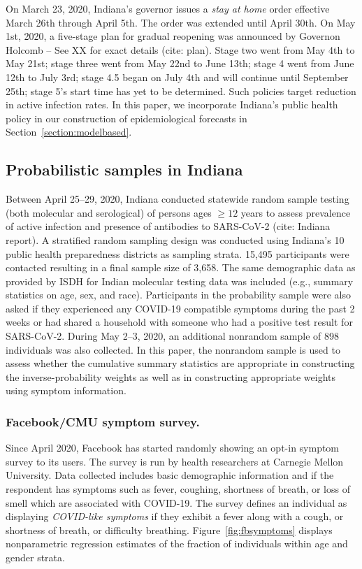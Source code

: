 \documentclass[12pt]{amsart}
\numberwithin{equation}{section}
\theoremstyle{plain}
\begin{document}
On March 23, 2020, Indiana's governor issues a \emph{stay at home} order effective March 26th through April 5th.  The order was extended until April 30th. On May 1st, 2020, a five-stage plan for gradual reopening was announced by Governon Holcomb -- See XX for exact details (cite: plan).  Stage two went from May 4th to May 21st; stage three went from May 22nd to June 13th; stage 4 went from June 12th to July 3rd; stage 4.5 began on July 4th and will continue until September 25th; stage 5's start time has yet to be determined.  Such  policies target reduction in active infection rates. In this paper, we incorporate Indiana's public health policy in our construction of epidemiological forecasts in Section~\ref{section:modelbased}.


\subsection{Probabilistic samples in Indiana}

Between April 25--29, 2020, Indiana conducted statewide random sample testing (both molecular and serological) of persons ages $\geq 12$ years to assess prevalence of active infection and presence of antibodies to SARS-CoV-2 (cite: Indiana report). A stratified random sampling design was conducted using Indiana’s 10 public health preparedness districts as sampling strata. 15,495 participants were contacted resulting in a final sample size of 3,658. The same demographic data as provided by ISDH for Indian molecular testing data was included (e.g., summary statistics on age, sex, and race). Participants in the probability sample were also asked if they experienced any COVID-19 compatible symptoms during the past 2 weeks or had shared a household with someone who had a positive test result for SARS-CoV-2. During May 2--3, 2020, an additional nonrandom sample of 898 individuals was also collected.  In this paper, the nonrandom sample is used to assess whether the cumulative summary statistics are appropriate in constructing the inverse-probability weights as well as in constructing appropriate weights using symptom information.

\subsubsection{Facebook/CMU symptom survey.}
Since April 2020, Facebook has started randomly showing an opt-in symptom survey to its users.  The survey is run by health researchers at Carnegie Mellon University. Data collected includes basic demographic information and if the respondent has symptoms such as fever, coughing, shortness of breath, or loss of smell which are associated with COVID-19.  The survey defines an individual as displaying \emph{COVID-like symptoms} if they exhibit a fever along with a cough, or shortness of breath, or difficulty breathing.  Figure~\ref{fig:fbsymptoms} displays nonparametric regression estimates of the fraction of individuals within age and gender strata.
\end{document}
